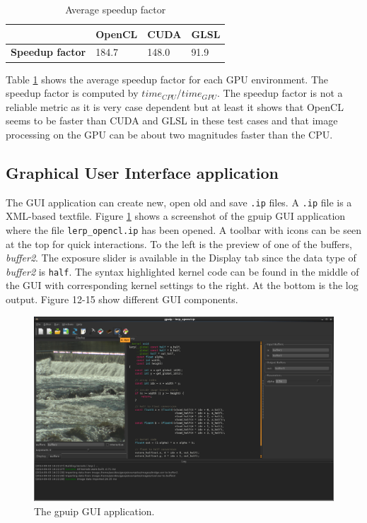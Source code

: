 \begin {table}[H]
\caption {Average speedup factor} \label{tabfactor} 
\begin{center}
    \begin{tabular}{| l | l | l | l  |}
    \hline
     & \textbf{OpenCL} & \textbf{CUDA} & \textbf{GLSL} \\ \hline
    \textbf{Speedup factor} & 184.7 & 148.0 & 91.9 \\ \hline
    \end{tabular}
\end{center}
\end{table}

Table \ref{tabfactor} shows the average speedup factor for each GPU environment. The speedup factor is computed by $time_{CPU} / time_{GPU}$. The speedup factor is not a reliable metric as it is very case dependent but at least it shows that OpenCL seems to be faster than CUDA and GLSL in these test cases and that image processing on the GPU can be about two magnitudes faster than the CPU.

\subsection{Graphical User Interface application}

The GUI application can create new, open old and save {\tt .ip} files. A {\tt .ip} file is a XML-based textfile. Figure \ref{gpuipgui} shows a screenshot of the gpuip GUI application where the file {\tt lerp\_opencl.ip} has been opened. A toolbar with icons can be seen at the top for quick interactions. To the left is the preview of one of the buffers, \emph{buffer2}. The exposure slider is available in the Display tab since the data type of  \emph{buffer2} is {\tt half}. The syntax highlighted kernel code can be found in the middle of the GUI with corresponding kernel settings to the right. At the bottom is the log output. Figure 12-15 show different GUI components.

\begin{center}
\begin{figure}[ht!]
\centering
\includegraphics[width=140mm]{img/gpuip.png}
\caption{The gpuip GUI application.}
\label{gpuipgui}
\end{figure}
\end{center}

